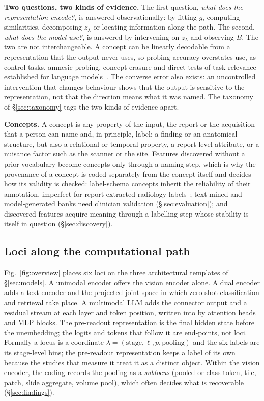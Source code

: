 \textbf{Two questions, two kinds of evidence.} The first question, \emph{what does the representation
encode?}, is answered observationally: by fitting $g$, computing similarities, decomposing $z_\lambda$ or
locating information along the path. The second, \emph{what does the model use?}, is answered by
intervening on $z_\lambda$ and observing $B$. The two are not interchangeable. A concept can be linearly
decodable from a representation that the output never uses, so probing accuracy overstates use, as
control tasks, amnesic probing, concept erasure and direct tests of task relevance established for
language
models~\cite{hewitt2019designing,elazar2020amnesic,ravfogel2020null,belrose2023leace,ravichander2021probing,ivanova2021probing}.
The converse error also exists: an uncontrolled intervention that changes behaviour shows that the
output is sensitive to the representation, not that the direction means what it was named. The
taxonomy of \S\ref{sec:taxonomy} tags the two kinds of evidence apart.

\textbf{Concepts.} A concept is any property of the input, the report or the acquisition that a person can
name and, in principle, label: a finding or an anatomical structure, but also a relational or temporal
property, a report-level attribute, or a nuisance factor such as the scanner or the site. Features
discovered without a prior vocabulary become concepts only through a naming step, which is why the
provenance of a concept is coded separately from the concept itself and decides how its validity is
checked: label-schema concepts inherit the reliability of their annotation, imperfect for
report-extracted radiology labels~\cite{irvin2019chexpert,smit2020chexbert}; text-mined and
model-generated banks need clinician validation (\S\ref{sec:evaluation}); and discovered features
acquire meaning through a labelling step whose stability is itself in question (\S\ref{sec:discovery}).

\subsection{Loci along the computational path}
\label{sec:loci}

Fig.~\ref{fig:overview} places six loci on the three architectural templates of \S\ref{sec:models}. A
unimodal encoder offers the vision encoder alone. A dual encoder adds a text encoder and the projected
joint space in which zero-shot classification and retrieval take place. A multimodal LLM adds the
connector output and a residual stream at each layer and token position, written into by attention heads
and MLP blocks. The pre-readout representation is the final hidden state before the unembedding; the
logits and tokens that follow it are end-points, not loci. Formally a locus is a coordinate
$\lambda=(\text{stage},\ell,p,\text{pooling})$ and the six labels are its stage-level bins; the
pre-readout representation keeps a label of its own because the studies that measure it treat it as a
distinct object. Within the vision encoder, the coding records the pooling as a \emph{sublocus} (pooled
or class token, tile, patch, slide aggregate, volume pool), which often decides what is recoverable
(\S\ref{sec:findings}).

